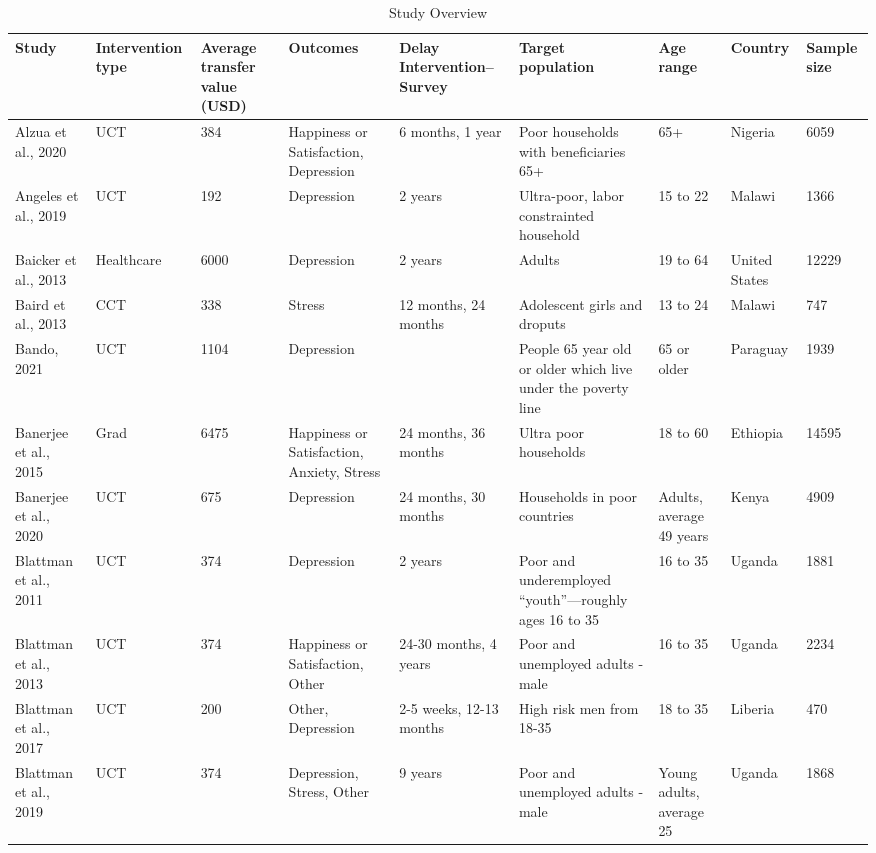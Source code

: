 \begin{table}[ht]
\centering
\caption{Study Overview} 
\begingroup\scriptsize
\begin{tabular}{p{1.8cm}p{1.7cm}p{1.3 cm}p{2cm}p{1.7cm}p{2.0cm}p{1cm}p{1.2cm}p{1cm}}
  \hline
{\textbf{Study}} & {\textbf{Intervention type}} & {\textbf{Average transfer value (USD)}} & {\textbf{Outcomes}} & {\textbf{Delay Intervention--Survey}} & {\textbf{Target 
 population}} & {\textbf{Age 
 range}} & {\textbf{Country}} & {\textbf{Sample 
 size}} \\ 
  \hline
Alzua et al., 2020 & UCT & 384 & Happiness or Satisfaction, Depression & 6 months, 1 year & Poor households with beneficiaries 65+ & 65+ & Nigeria & 6059 \\ 
   \hline
Angeles et al., 2019 & UCT & 192 & Depression & 2 years & Ultra-poor, labor constrainted household & 15 to 22 & Malawi & 1366 \\ 
   \hline
Baicker et al., 2013 & Healthcare & 6000 & Depression & 2 years & Adults & 19 to 64 & United States & 12229 \\ 
   \hline
Baird et al., 2013 & CCT & 338 & Stress & 12 months, 24 months & Adolescent girls and droputs & 13 to 24 & Malawi & 747 \\ 
   \hline
Bando, 2021 & UCT & 1104 & Depression &  & People 65 year old or older which live under the poverty line & 65 or older & Paraguay & 1939 \\ 
   \hline
Banerjee et al., 2015 & Grad & 6475 & Happiness or Satisfaction, Anxiety, Stress & 24 months, 36 months & Ultra poor households & 18 to 60 & Ethiopia & 14595 \\ 
   \hline
Banerjee et al., 2020 & UCT & 675 & Depression & 24 months, 30 months & Households in poor countries & Adults, average 49 years & Kenya & 4909 \\ 
   \hline
Blattman et al., 2011 & UCT & 374 & Depression & 2 years & Poor and underemployed “youth”—roughly ages 16 to 35 & 16 to 35 & Uganda & 1881 \\ 
   \hline
Blattman et al., 2013 & UCT & 374 & Happiness or Satisfaction, Other & 24-30 months, 4 years & Poor and unemployed adults - male & 16 to 35 & Uganda & 2234 \\ 
   \hline
Blattman et al., 2017 & UCT & 200 & Other, Depression & 2-5 weeks, 12-13 months & High risk men from 18-35 & 18 to 35 & Liberia & 470 \\ 
   \hline
Blattman et al., 2019 & UCT & 374 & Depression, Stress, Other & 9 years & Poor and unemployed adults - male & Young adults, average 25 & Uganda & 1868 \\ 

\end{tabular}
\end{table}
